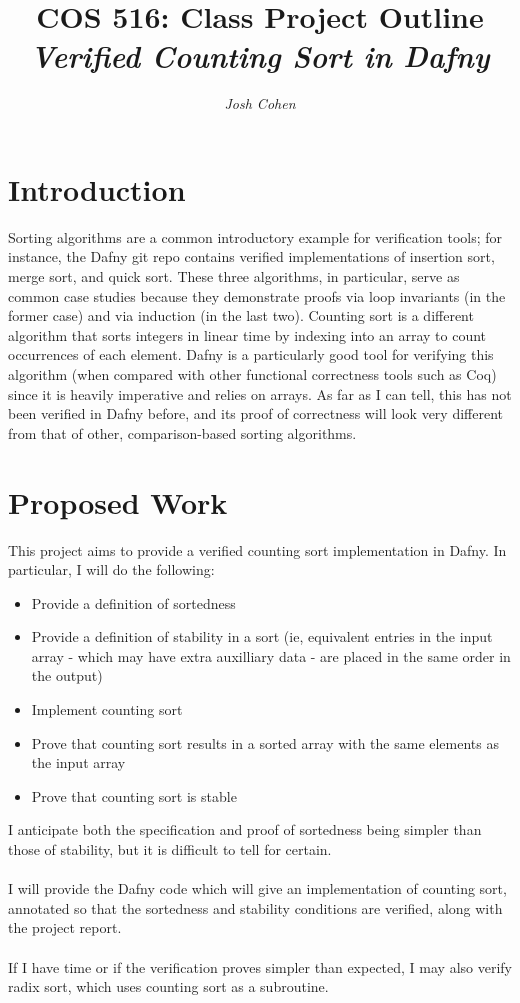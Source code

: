 \documentclass[10pt]{article}
\title{COS 516: Class Project Outline\\
\emph{Verified Counting Sort in Dafny}}
\author{\emph{Josh Cohen}}
\begin{document}
\maketitle

\section{Introduction}

Sorting algorithms are a common introductory example for verification tools; for instance, the Dafny git repo contains verified implementations of insertion sort, merge sort, and quick sort. These three algorithms, in particular, serve as common case studies because they demonstrate proofs via loop invariants (in the former case) and via induction (in the last two). Counting sort is a different algorithm that sorts integers in linear time by indexing into an array to count occurrences of each element. Dafny is a particularly good tool for verifying this algorithm (when compared with other functional correctness tools such as Coq) since it is heavily imperative and relies on arrays. As far as I can tell, this has not been verified in Dafny before, and its proof of correctness will look very different from that of other, comparison-based sorting algorithms. 

\section{Proposed Work}

This project aims to provide a verified counting sort implementation in Dafny. In particular, I will do the following:
\begin{itemize}
\item
Provide a definition of sortedness
\item
Provide a definition of stability in a sort (ie, equivalent entries in the input array - which may have extra auxilliary data - are placed in the same order in the output)
\item
Implement counting sort
\item
Prove that counting sort results in a sorted array with the same elements as the input array
\item
Prove that counting sort is stable
\end{itemize}
I anticipate both the specification and proof of sortedness being simpler than those of stability, but it is difficult to tell for certain.
\\
\\I will provide the Dafny code which will give an implementation of counting sort, annotated so that the sortedness and stability conditions are verified, along with the project report.
\\
\\If I have time or if the verification proves simpler than expected, I may also verify radix sort, which uses counting sort as a subroutine.
\end{document}
